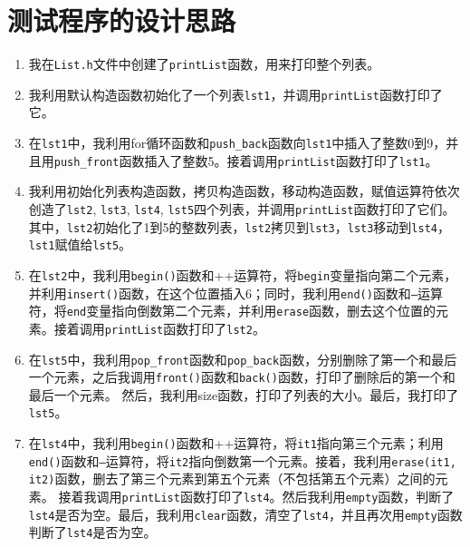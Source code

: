 \documentclass[UTF8]{ctexart}
\begin{document}
\pagestyle{fancy}
\fancyhead{}

\section{测试程序的设计思路}
\begin{enumerate}  
    \item 我在\texttt{List.h}文件中创建了\texttt{printList}函数，用来打印整个列表。  
    \item 我利用默认构造函数初始化了一个列表\texttt{lst1}，并调用\texttt{printList}函数打印了它。  
    \item 在\texttt{lst1}中，我利用for循环函数和\texttt{push\_back}函数向\texttt{lst1}中插入了整数0到9，并且用\texttt{push\_front}函数插入了整数5。接着调用\texttt{printList}函数打印了\texttt{lst1}。  
    \item 我利用初始化列表构造函数，拷贝构造函数，移动构造函数，赋值运算符依次创造了\texttt{lst2}, \texttt{lst3}, \texttt{lst4}, \texttt{lst5}四个列表，并调用\texttt{printList}函数打印了它们。其中，\texttt{lst2}初始化了1到5的整数列表，\texttt{lst2}拷贝到\texttt{lst3}，\texttt{lst3}移动到\texttt{lst4}，\texttt{lst1}赋值给\texttt{lst5}。  
    \item 在\texttt{lst2}中，我利用\texttt{begin()}函数和++运算符，将\texttt{begin}变量指向第二个元素，并利用\texttt{insert()}函数，在这个位置插入6；同时，我利用\texttt{end()}函数和\texttt{--}运算符，将\texttt{end}变量指向倒数第二个元素，并利用\texttt{erase}函数，删去这个位置的元素。接着调用\texttt{printList}函数打印了\texttt{lst2}。  
    \item 在\texttt{lst5}中，我利用\texttt{pop\_front}函数和\texttt{pop\_back}函数，分别删除了第一个和最后一个元素，之后我调用\texttt{front()}函数和\texttt{back()}函数，打印了删除后的第一个和最后一个元素。
    然后，我利用size函数，打印了列表的大小。最后，我打印了\texttt{lst5}。
    \item 在\texttt{lst4}中，我利用\texttt{begin()}函数和++运算符，将\texttt{it1}指向第三个元素；利用\texttt{end()}函数和\texttt{--}运算符，将\texttt{it2}指向倒数第一个元素。接着，我利用\texttt{erase(it1, it2)}函数，删去了第三个元素到第五个元素（不包括第五个元素）之间的元素。
    接着我调用\texttt{printList}函数打印了\texttt{lst4}。然后我利用\texttt{empty}函数，判断了\texttt{lst4}是否为空。最后，我利用\texttt{clear}函数，清空了\texttt{lst4}，并且再次用\texttt{empty}函数判断了\texttt{lst4}是否为空。

\end{enumerate}
\end{document}
